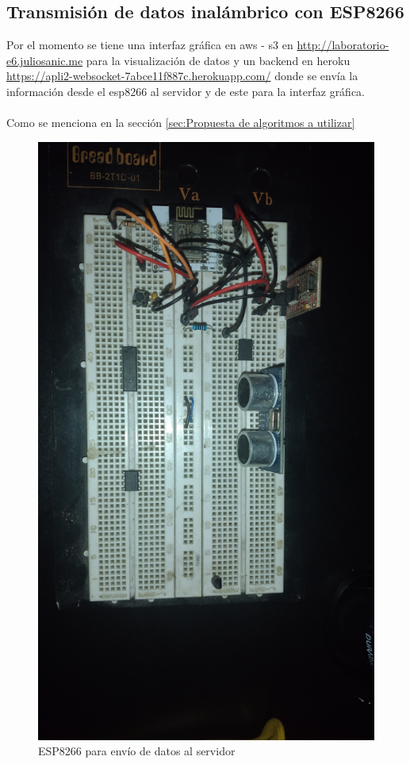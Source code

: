 \documentclass[journal]{IEEEtran}
\begin{document}
\subsection{Transmisión de datos inalámbrico con ESP8266}
Por el momento se tiene una interfaz gráfica en aws - s3 en \url{http://laboratorio-e6.juliosanic.me} para la visualización de datos y un backend en heroku \url{https://apli2-websocket-7abce11f887c.herokuapp.com/} donde se envía la información desde el esp8266 al servidor y de este para la interfaz gráfica.
\\\\
Como se menciona en la sección \ref{sec:Propuesta de algoritmos a utilizar}


\begin{figure}[H]
    \centering
    \includegraphics[scale=0.05]{images/20231001_152253.jpg}
    \caption{ESP8266 para envío de datos al servidor}
\end{figure}
\end{document}
